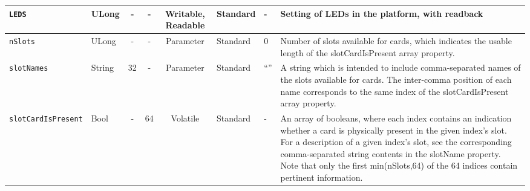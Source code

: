\documentclass{article}
\begin{document}
\begin{landscape}
\begin{scriptsize}
\begin{tabular}{|p{3cm}|p{1.5cm}|c|c|c|p{1.5cm}|p{1cm}|p{6cm}|}
			\hline
			\verb+LEDS+        & ULong  & -              & -               & Writable, Readable & Standard    & -       & Setting of LEDs in the platform, with readback                                \\
			\hline
			\verb+nSlots+      & ULong  & -              & -               & Parameter & Standard & 0 & Number of slots available for cards, which indicates the usable length of the slotCardIsPresent array property. \\
			\hline
			\verb+slotNames+   & String & 32             & -               & Parameter & Standard & ``'' & A string which is intended to include comma-separated names of the slots available for cards. The inter-comma position of each name corresponds to the same index of the slotCardIsPresent array property. \\
			\hline
			\verb+slotCardIsPresent+ & Bool & -          & 64              & Volatile           & Standard    & -       & An array of booleans, where each index contains an indication whether a card is physically present in the given index's slot. For a description of a given index's slot, see the corresponding comma-separated string contents in the slotName property. Note that only the first min(nSlots,64) of the 64 indices contain pertinent information. \\
			\hline

		\end{tabular}
	\end{scriptsize}

\end{landscape}
\end{document}
